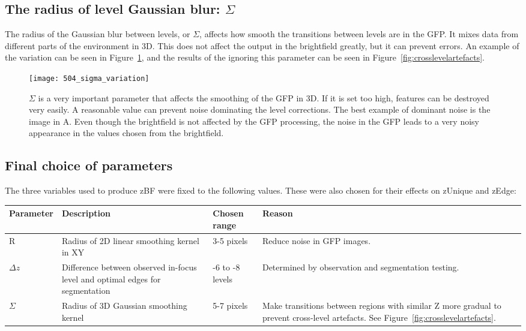 \subsection{The radius of level Gaussian blur: $\Sigma$}

The radius of the Gaussian blur between levels, or $\Sigma$, affects how smooth the transitions between levels are in the GFP. It mixes data from different parts of the environment in 3D. This does not affect the output in the brightfield greatly, but it can prevent errors. An example of the variation can be seen in Figure~\ref{fig:sigmavariation}, and the results of the ignoring this parameter can be seen in Figure~\ref{fig:crosslevelartefacts}.

\begin{figure}[h!]
 \centering
 \texttt{[image: 504\_sigma\_variation]}
 \caption[Varying $\Sigma$]{
 	$\Sigma$ is a very important parameter that affects the smoothing of the GFP in 3D. If it is set too high, features can be destroyed very easily. A reasonable value can prevent noise dominating the level corrections. The best example of dominant noise is the image in A. Even though the brightfield is not affected by the GFP processing, the noise in the GFP leads to a very noisy appearance in the values chosen from the brightfield.
 }
 \label{fig:sigmavariation}
\end{figure}

\subsection{Final choice of parameters}

The three variables used to produce zBF were fixed to the following values. These were also chosen for their effects on zUnique and zEdge:

\begin{center}
	\begin{tabular}{ | l | p{5cm} | l | p{5cm} |}
		\hline
		Parameter & Description & Chosen range & Reason \\ \hline
		R & Radius of 2D linear smoothing kernel in XY & 3-5 pixels & Reduce noise in GFP images. \\ \hline
		$\Delta z$ & Difference between observed in-focus level and optimal edges for segmentation & -6 to -8 levels & Determined by observation and segmentation testing. \\ \hline
		$\Sigma$ & Radius of 3D Gaussian smoothing kernel & 5-7 pixels & Make transitions between regions with similar Z more gradual to prevent cross-level artefacts. See Figure~\ref{fig:crosslevelartefacts}. \\ \hline
	\end{tabular}
\end{center}

